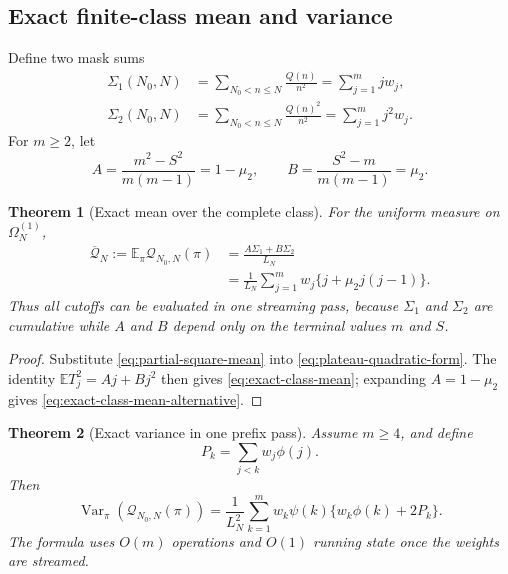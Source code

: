 \documentclass[11pt,reqno]{amsart}
\numberwithin{equation}{section}
\theoremstyle{plain}
\newtheorem{theorem}{Theorem}[section]
\theoremstyle{definition}
\theoremstyle{remark}
\newcommand{\E}{\mathbb E}
\newcommand{\Var}{\operatorname{Var}}
\newcommand{\Om}{\Omega}
\newcommand{\QF}{\mathcal Q}
\begin{document}
\subsection{Exact finite-class mean and variance}
\label{subsec:exact-mean-variance}

Define two mask sums
\begin{align}
\Sigma_1(N_0,N)
&=\sum_{N_0<n\leq N}\frac{Q(n)}{n^2}
=\sum_{j=1}^m j w_j,
\label{eq:sigma-one}\\
\Sigma_2(N_0,N)
&=\sum_{N_0<n\leq N}\frac{Q(n)^2}{n^2}
=\sum_{j=1}^m j^2w_j.
\label{eq:sigma-two}
\end{align}
For \(m\geq2\), let
\begin{equation}
A=\frac{m^2-S^2}{m(m-1)}=1-\mu_2,\qquad
B=\frac{S^2-m}{m(m-1)}=\mu_2.
\label{eq:quadratic-reduction-coefficients}
\end{equation}

\begin{theorem}[Exact mean over the complete class]
\label{thm:exact-class-mean}
For the uniform measure on \(\Om_N^{(1)}\),
\begin{align}
\overline{\QF}_N
:=\E_{\pi}\QF_{N_0,N}(\pi)
&=\frac{A\Sigma_1+B\Sigma_2}{L_N}
\label{eq:exact-class-mean}\\
&=\frac{1}{L_N}\sum_{j=1}^m
w_j\{j+\mu_2j(j-1)\}.
\label{eq:exact-class-mean-alternative}
\end{align}
Thus all cutoffs can be evaluated in one streaming pass, because
\(\Sigma_1\) and \(\Sigma_2\) are cumulative while \(A\) and \(B\) depend
only on the terminal values \(m\) and \(S\).
\end{theorem}

\begin{proof}
Substitute \eqref{eq:partial-square-mean} into
\eqref{eq:plateau-quadratic-form}.  The identity
\(\E T_j^2=Aj+Bj^2\) then gives \eqref{eq:exact-class-mean}; expanding
\(A=1-\mu_2\) gives \eqref{eq:exact-class-mean-alternative}.
\end{proof}

\begin{theorem}[Exact variance in one prefix pass]
\label{thm:exact-class-variance}
Assume \(m\geq4\), and define
\begin{equation}
P_k=\sum_{j<k}w_j\phi(j).
\label{eq:variance-prefix}
\end{equation}
Then
\begin{equation}
\Var_{\pi}\!\left(\QF_{N_0,N}(\pi)\right)
=\frac{1}{L_N^2}\sum_{k=1}^{m}
w_k\psi(k)\{w_k\phi(k)+2P_k\}.
\label{eq:exact-class-variance}
\end{equation}
The formula uses \(O(m)\) operations and \(O(1)\) running state once the
weights are streamed.
\end{theorem}
\end{document}
